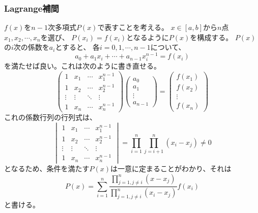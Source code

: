 \documentclass[a4j, titlepage]{jsarticle}
\numberwithin{equation}{section}
\begin{document}
        \subsubsection{Lagrange補間}
            $f(x)$を$n-1$次多項式$P(x)$で表すことを考える。
            $x\in[a,b]$から$n$点$x_1,x_2,\cdots,x_n$を選び、
            $P(x_i)=f(x_i)$となるように$P(x)$を構成する。
            $P(x)$の$i$次の係数を$a_i$とすると、
            各$i=0,1,\cdots,n-1$について、
            \begin{equation*}
                a_0 + a_1x_i + \cdots + a_{n-1}x_i^{n-1} = f(x_i)
            \end{equation*}
            を満たせば良い。これは次のように書き直せる。
            \begin{equation*}
                \begin{pmatrix}
                    1 & x_1 & \cdots & x_1^{n-1} \\
                    1 & x_2 & \cdots & x_2^{n-1} \\
                    \vdots & \vdots & \ddots & \vdots \\
                    1 & x_n & \cdots & x_n^{n-1}
                \end{pmatrix}\begin{pmatrix}
                    a_0 \\
                    a_1 \\
                    \vdots \\
                    a_{n-1}
                \end{pmatrix} = \begin{pmatrix}
                    f(x_1) \\
                    f(x_2) \\
                    \vdots \\
                    f(x_n)
                \end{pmatrix}
            \end{equation*}
            これの係数行列の行列式は、
            \begin{equation*}
                \begin{vmatrix}
                    1 & x_1 & \cdots & x_1^{n-1} \\
                    1 & x_2 & \cdots & x_2^{n-1} \\
                    \vdots & \vdots & \ddots & \vdots \\
                    1 & x_n & \cdots & x_n^{n-1}
                \end{vmatrix} = \prod_{i=1}^n\prod_{j=i+1}^n(x_i-x_j)\neq 0
            \end{equation*}
            となるため、条件を満たす$P(x)$は一意に定まることがわかり、それは
            \begin{equation}
                P(x) = \sum_{i=1}^n\frac{\displaystyle\prod_{j=1,j\neq i}^n (x-x_j)}{\displaystyle\prod_{j=1,j\neq i}^n (x_i-x_j)}f(x_i)
            \end{equation}
            と書ける。
\end{document}
